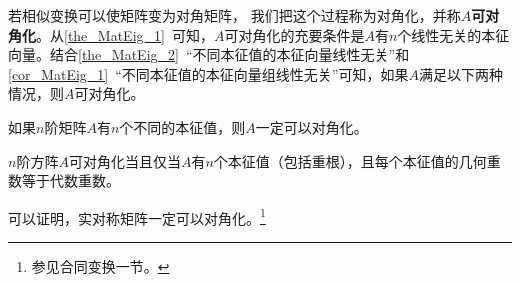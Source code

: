 若相似变换可以使矩阵变为对角矩阵， 我们把这个过程称为对角化，并称$A$\textbf{可对角化}。从\autoref{the_MatEig_1}~可知，$A$可对角化的充要条件是$A$有$n$个线性无关的本征向量。结合\autoref{the_MatEig_2}~“不同本征值的本征向量线性无关”和\autoref{cor_MatEig_1}~“不同本征值的本征向量组线性无关”可知，如果$A$满足以下两种情况，则$A$可对角化。
\begin{corollary}{}
如果$n$阶矩阵$A$有$n$个不同的本征值，则$A$一定可以对角化。
\end{corollary}
\begin{corollary}{}
$n$阶方阵$A$可对角化当且仅当$A$有$n$个本征值（包括重根），且每个本征值的几何重数等于代数重数。
\end{corollary}



可以证明，实对称矩阵一定可以对角化。\footnote{参见合同变换一节。}

